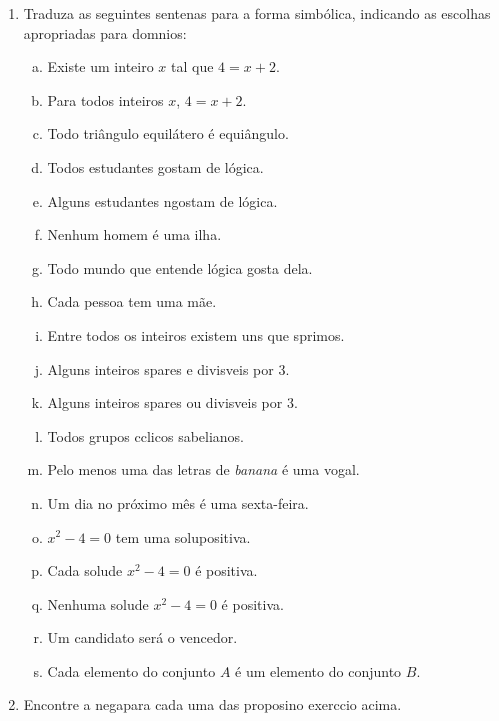 \begin{enumerate}[{\bf 1.}]
\item Traduza as seguintes senten\cc as para a forma simb\'olica, indicando as escolhas apropriadas para dom\ih nios:
\begin{enumerate}[a)]
\item Existe um inteiro $x$ tal que $4=x+2$.
\item Para todos inteiros $x$, $4=x+2$.
\item Todo tri\^angulo equil\'atero \'e equi\^angulo.
\item Todos estudantes gostam de l\'ogica.
\item Alguns estudantes n\ao gostam de l\'ogica.
\item Nenhum homem \'e uma ilha.
\item Todo mundo que entende l\'ogica gosta dela.
\item Cada pessoa tem uma m\~ae.
\item Entre todos os inteiros existem uns que s\ao primos.
\item Alguns inteiros s\ao pares e divis\ih veis por 3.
\item Alguns inteiros s\ao pares ou divis\ih veis por 3.
\item Todos grupos c\ih clicos s\ao abelianos.
\item Pelo menos uma das letras de {\it banana} \'e uma vogal.
\item Um dia no pr\'oximo m\^es \'e uma sexta-feira.
\item $x^2-4=0$ tem uma solu\cao positiva.
\item Cada solu\cao de $x^2-4=0$ \'e positiva.
\item Nenhuma solu\cao de $x^2-4=0$ \'e positiva.
\item Um candidato ser\'a o vencedor.
\item Cada elemento do conjunto $A$ \'e um elemento do conjunto $B$.
\end{enumerate}

\item Encontre a nega\cao para cada uma das proposi\coes no exerc\ih cio acima.


\end{enumerate}
